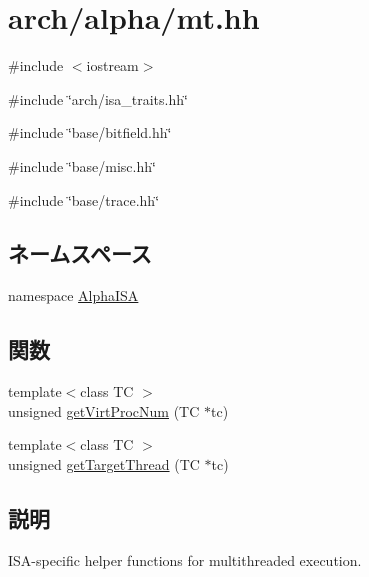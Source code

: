 \hypertarget{alpha_2mt_8hh}{
\section{arch/alpha/mt.hh}
\label{alpha_2mt_8hh}
}
{\ttfamily \#include $<$iostream$>$}\par
{\ttfamily \#include \char`\"{}arch/isa\_\-traits.hh\char`\"{}}\par
{\ttfamily \#include \char`\"{}base/bitfield.hh\char`\"{}}\par
{\ttfamily \#include \char`\"{}base/misc.hh\char`\"{}}\par
{\ttfamily \#include \char`\"{}base/trace.hh\char`\"{}}\par
\subsection*{ネームスペース}
\begin{DoxyCompactItemize}
\item 
namespace \hyperlink{namespaceAlphaISA}{AlphaISA}
\end{DoxyCompactItemize}
\subsection*{関数}
\begin{DoxyCompactItemize}
\item 
{\footnotesize template$<$class TC $>$ }\\unsigned \hyperlink{namespaceAlphaISA_a9f62368d1287f246b4026dfb6206bc4d}{getVirtProcNum} (TC $\ast$tc)
\item 
{\footnotesize template$<$class TC $>$ }\\unsigned \hyperlink{namespaceAlphaISA_a7956606c6fe17700d24242789ae5002c}{getTargetThread} (TC $\ast$tc)
\end{DoxyCompactItemize}


\subsection{説明}
ISA-\/specific helper functions for multithreaded execution. 